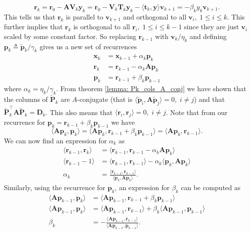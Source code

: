 \[
    \bm{r}_k = \bm{r}_0 - \bm{A} \bm{V}_{k} \bm{y}_k = \bm{r}_0 - \bm{V}_{k} \bm{T}_k \bm{y}_k - \langle \bm{t}_k , \bm{y} \rangle \bm{v}_{k+1} = - \beta_k y_k \bm{v}_{k+1}.
\]
This tells us that $\bm{r}_k$ is parallel to $\bm{v}_{k+1}$ and orthogonal to all $\bm{v}_{i}, \; 1 \leq i \leq k$. This further implies that $\bm{r}_k$ is orthogonal to all $\bm{r}_i, \; 1 \leq i \leq k-1$ since they are just $\bm{v}_{i}$ scaled by some constant factor. So replacing $\bm{r}_{k-1}$ with $\bm{v}_k / \eta_k$ and defining $\bm{p}_k \triangleq \tilde{\bm{p}}_k / \gamma_k$ gives us a new set of recurrences
\begin{align*}
    \bm{x}_k & = \bm{x}_{k-1} + \alpha_k \bm{p}_k        \\
    \bm{r}_k & = \bm{r}_{k-1} - \alpha_k \bm{A} \bm{p}_k \\
    \bm{p}_k & = \bm{r}_{k-1} + \beta_k \bm{p}_{k-1}
\end{align*}
where $\alpha_k = \eta_k / \gamma_k$. From theorem \ref{lemma: Pk_cols_A_conj} we have shown that the columns of $\tilde{\bm{P}}_k$ are $A$-conjugate (that is $\langle \tilde{\bm{p}}_i , \bm{A} \tilde{\bm{p}}_j \rangle = 0, \; i \neq j$) and that $\tilde{\bm{P}}_k^{\intercal} \bm{A} \tilde{\bm{P}}_k = \bm{D}_k$. This also means that $\langle \bm{r}_i , \bm{r}_j \rangle = 0, \; i \neq j$. Note that from our recurrence for $\bm{p}_k = \bm{r}_{k-1} + \beta_k \bm{p}_{k-1}$ we have
\[
    \langle \bm{A} \bm{p}_k ,\bm{p}_k \rangle = \langle \bm{A} \bm{p}_k , \bm{r}_{k-1} + \beta_k \bm{p}_{k-1} \rangle = \langle \bm{A} \bm{p}_k , \bm{r}_{k-1} \rangle.
\]
We can now find an expression for $\alpha_k$ as
\begin{align*}
    \langle \bm{r}_{k-1} , \bm{r}_{k} \rangle & = \langle \bm{r}_{k-1} , \bm{r}_{k-1} - \alpha_k \bm{A} \bm{p}_k \rangle                           \\
    \langle \bm{r}_{k-1} -1 \rangle           & = \langle \bm{r}_{k-1} , \bm{r}_{k-1} \rangle - \alpha_k \langle \bm{p}_k, \bm{A} \bm{p}_k \rangle \\
    \alpha_k                                  & = \frac{\langle \bm{r}_{k-1} , \bm{r}_{k-1} \rangle}{\langle \bm{p}_k, \bm{A} \bm{p}_k \rangle}.
\end{align*}
Similarly, using the recurrence for $\bm{p}_k$, an expression for $\beta_k$ can be computed as
\begin{align*}
    \langle \bm{A} \bm{p}_{k-1} , \bm{p}_k \rangle & = \langle \bm{A} \bm{p}_{k-1}, \bm{r}_{k-1} + \beta_k \bm{p}_{k-1} \rangle                                       \\
    \langle \bm{A} \bm{p}_{k-1} , \bm{p}_k \rangle & = \langle \bm{A} \bm{p}_{k-1}, \bm{r}_{k-1} \rangle + \beta_k \langle \bm{A} \bm{p}_{k-1}, \bm{p}_{k-1} \rangle  \\
    \beta_k                                        & = - \frac{\langle \bm{A} \bm{p}_{k-1}, \bm{r}_{k-1} \rangle}{\langle \bm{A} \bm{p}_{k-1}, \bm{p}_{k-1} \rangle}.
\end{align*}

